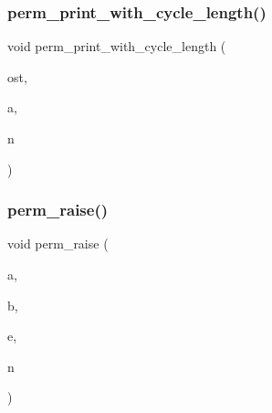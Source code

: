 \mbox{\label{combinatorics_8_c_a76955abb48cb6ae14e996009e2bbd67d}} 
\subsubsection{\texorpdfstring{perm\+\_\+print\+\_\+with\+\_\+cycle\+\_\+length()}{perm\_print\_with\_cycle\_length()}}
{\footnotesize\ttfamily void perm\+\_\+print\+\_\+with\+\_\+cycle\+\_\+length (\begin{DoxyParamCaption}\item[{ostream \&}]{ost,  }\item[{\mbox{\hyperlink{galois_8h_a09fddde158a3a20bd2dcadb609de11dc}{I\+NT}} $\ast$}]{a,  }\item[{\mbox{\hyperlink{galois_8h_a09fddde158a3a20bd2dcadb609de11dc}{I\+NT}}}]{n }\end{DoxyParamCaption})}

\mbox{\label{combinatorics_8_c_a24cac9508500dedcec9b83f31f18ec93}} 
\subsubsection{\texorpdfstring{perm\+\_\+raise()}{perm\_raise()}}
{\footnotesize\ttfamily void perm\+\_\+raise (\begin{DoxyParamCaption}\item[{\mbox{\hyperlink{galois_8h_a09fddde158a3a20bd2dcadb609de11dc}{I\+NT}} $\ast$}]{a,  }\item[{\mbox{\hyperlink{galois_8h_a09fddde158a3a20bd2dcadb609de11dc}{I\+NT}} $\ast$}]{b,  }\item[{\mbox{\hyperlink{galois_8h_a09fddde158a3a20bd2dcadb609de11dc}{I\+NT}}}]{e,  }\item[{\mbox{\hyperlink{galois_8h_a09fddde158a3a20bd2dcadb609de11dc}{I\+NT}}}]{n }\end{DoxyParamCaption})}

\mbox{\label{combinatorics_8_c_aba59241974eef0c0a89e0a408327c3a9}} 
